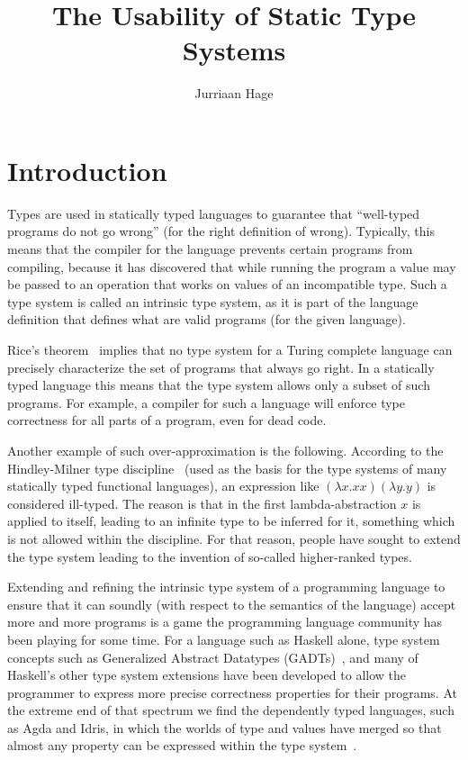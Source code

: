 \documentclass[sigplan,10pt,noacm]{acmart}
\begin{document}
\title{The Usability of Static Type Systems}
\author{Jurriaan Hage}

\maketitle


\section{Introduction}

Types are used in statically typed languages to guarantee that
``well-typed programs do not go wrong'' (for the right definition of
wrong). Typically, this means that the compiler for the language
prevents certain programs from compiling, because it has discovered
that while running the program a value may be passed to an operation that
works on values of an incompatible type. Such a type system is called an 
intrinsic type system,
as it is part of the language definition that defines what are valid
programs (for the given language). 

Rice's theorem~\cite{ricestheorem} implies that no type system for a Turing complete
language can precisely characterize the set of programs that always go right.
In a statically typed language this means that the type system allows
only a subset of such programs. For example, a compiler for such a language
will enforce type correctness for all parts of a program, even for dead code.

Another example of such over-approximation is the following. 
According to the Hindley-Milner type discipline~\cite{milner78theory} (used as the basis
for the type systems of many statically typed functional languages), 
an expression like $(\lambda x . x x) (\lambda y. y)$ is considered
ill-typed. The reason is that in the first lambda-abstraction $x$ is applied
to itself, leading to an infinite type to be inferred for it, something which
is not allowed within the discipline. For that reason, people have sought
to extend the type system leading to the invention of so-called 
higher-ranked types.

Extending and refining the intrinsic type system of a programming language to 
ensure that it can soundly (with respect to the semantics of the language)
accept more and more programs is a game the programming language community
has been playing for some time. For a language such as Haskell alone, 
type system concepts such as Generalized Abstract Datatypes (GADTs)~\cite{vytiniotis06gadts},
and many of Haskell's other type system extensions 
have been developed to allow the programmer to express more precise correctness
properties for their programs. At the extreme end of that spectrum we find
the dependently typed languages, such as Agda and Idris, in which the worlds of 
type and values have
merged so that almost any property can be expressed within the 
type system~\cite{wouter}.
\end{document}
